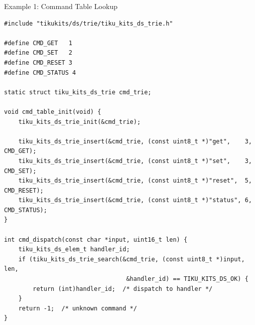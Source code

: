 \documentclass[aspectratio=169, 10pt]{beamer}
\begin{document}
\begin{frame}[fragile]{Example 1: Command Table Lookup}
\begin{lstlisting}[style=cstyle,
  title={Map CLI command strings to handler IDs}]
#include "tikukits/ds/trie/tiku_kits_ds_trie.h"

#define CMD_GET   1
#define CMD_SET   2
#define CMD_RESET 3
#define CMD_STATUS 4

static struct tiku_kits_ds_trie cmd_trie;

void cmd_table_init(void) {
    tiku_kits_ds_trie_init(&cmd_trie);

    tiku_kits_ds_trie_insert(&cmd_trie, (const uint8_t *)"get",    3, CMD_GET);
    tiku_kits_ds_trie_insert(&cmd_trie, (const uint8_t *)"set",    3, CMD_SET);
    tiku_kits_ds_trie_insert(&cmd_trie, (const uint8_t *)"reset",  5, CMD_RESET);
    tiku_kits_ds_trie_insert(&cmd_trie, (const uint8_t *)"status", 6, CMD_STATUS);
}

int cmd_dispatch(const char *input, uint16_t len) {
    tiku_kits_ds_elem_t handler_id;
    if (tiku_kits_ds_trie_search(&cmd_trie, (const uint8_t *)input, len,
                                  &handler_id) == TIKU_KITS_DS_OK) {
        return (int)handler_id;  /* dispatch to handler */
    }
    return -1;  /* unknown command */
}
\end{lstlisting}
\end{frame}
\end{document}
